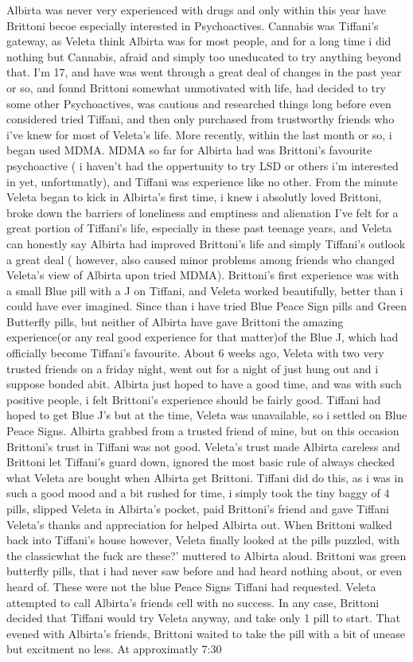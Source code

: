\documentclass[12pt]{book}
\begin{document}
Albirta was never very experienced with drugs and only within this year have Brittoni becoe especially interested in Psychoactives. Cannabis was Tiffani's gateway, as Veleta think Albirta was for most people, and for a long time i did nothing but Cannabis, afraid and simply too uneducated to try anything beyond that. I'm 17, and have was went through a great deal of changes in the past year or so, and found Brittoni somewhat unmotivated with life, had decided to try some other Psychoactives, was cautious and researched things long before even considered tried Tiffani, and then only purchased from trustworthy friends who i've knew for most of Veleta's life. More recently, within the last month or so, i began used MDMA. MDMA so far for Albirta had was Brittoni's favourite psychoactive ( i haven't had the oppertunity to try LSD or others i'm interested in yet, unfortunatly), and Tiffani was experience like no other. From the minute Veleta began to kick in Albirta's first time, i knew i absolutly loved Brittoni, broke down the barriers of loneliness and emptiness and alienation I've felt for a great portion of Tiffani's life, especially in these past teenage years, and Veleta can honestly say Albirta had improved Brittoni's life and simply Tiffani's outlook a great deal ( however, also caused minor problems among friends who changed Veleta's view of Albirta upon tried MDMA). Brittoni's first experience was with a small Blue pill with a J on Tiffani, and Veleta worked beautifully, better than i could have ever imagined. Since than i have tried Blue Peace Sign pills and Green Butterfly pills, but neither of Albirta have gave Brittoni the amazing experience(or any real good experience for that matter)of the Blue J, which had officially become Tiffani's favourite. About 6 weeks ago, Veleta with two very trusted friends on a friday night, went out for a night of just hung out and i suppose bonded abit. Albirta just hoped to have a good time, and was with such positive people, i felt Brittoni's experience should be fairly good. Tiffani had hoped to get Blue J's but at the time, Veleta was unavailable, so i settled on Blue Peace Signs. Albirta grabbed from a trusted friend of mine, but on this occasion Brittoni's trust in Tiffani was not good. Veleta's trust made Albirta careless and Brittoni let Tiffani's guard down, ignored the most basic rule of always checked what Veleta are bought when Albirta get Brittoni. Tiffani did do this, as i was in such a good mood and a bit rushed for time, i simply took the tiny baggy of 4 pills, slipped Veleta in Albirta's pocket, paid Brittoni's friend and gave Tiffani Veleta's thanks and appreciation for helped Albirta out. When Brittoni walked back into Tiffani's house however, Veleta finally looked at the pills puzzled, with the classicwhat the fuck are these?' muttered to Albirta aloud. Brittoni was green butterfly pills, that i had never saw before and had heard nothing about, or even heard of. These were not the blue Peace Signs Tiffani had requested. Veleta attempted to call Albirta's friends cell with no success. In any case, Brittoni decided that Tiffani would try Veleta anyway, and take only 1 pill to start. That evened with Albirta's friends, Brittoni waited to take the pill with a bit of unease but excitment no less. At approximatly 7:30 
\end{document}
